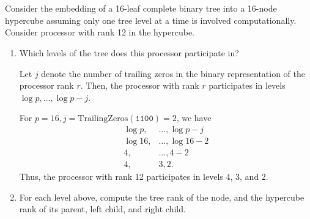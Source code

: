 \documentclass{article}
\begin{document}
\section{}
Consider the embedding of a 16-leaf complete binary tree into a 16-node hypercube assuming only one tree level at a time is involved computationally.
Consider processor with rank 12 in the hypercube.
\begin{enumerate}[label=(\alph*)]
  \item Which levels of the tree does this processor participate in?

  Let $j$ denote the number of trailing zeros in the binary representation of the processor rank $r$.
  Then, the processor with rank $r$ participates in levels $\log{p}, \dots, \log{p} - j$.
  
  For $p = 16, j = \text{TrailingZeros}\left(\texttt{1100}\right) = 2$, we have
  \begin{align*}
    \log{p}, &\dots, \log{p} - j\\
    \log{16}, &\dots, \log{16} - 2\\
    4, &\dots, 4 - 2\\
    4, &3, 2.
  \end{align*}
  Thus, the processor with rank 12 participates in levels 4, 3, and 2.
  \item For each level above, compute the tree rank of the node, and the hypercube rank of its parent, left child, and right child.


\end{enumerate}
\end{document}
